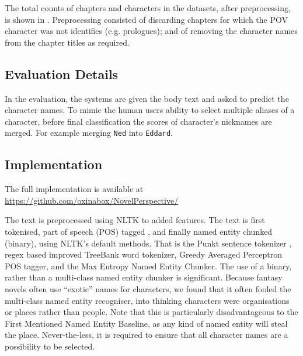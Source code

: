 \documentclass[11pt,a4paper]{article}
\newcommand{\parencite}{\citep}
\begin{document}
The total counts of chapters and characters in the datasets, after preprocessing, is shown in .
Preprocessing consisted of  discarding chapters for which the POV character was not identifies (e.g. prologues); and of removing the character names from the chapter titles as required.

\subsection{Evaluation Details}
In the evaluation, the systems are given the body text and asked to predict the character names.
To mimic the human users ability to select multiple aliases of a character, before final classification the scores of character's nicknames are merged.
For example merging \texttt{Ned} into \texttt{Eddard}.

%

\subsection{Implementation}
The full implementation is available at \url{https://github.com/oxinabox/NovelPerspective/}

The text is preprocessed using NLTK \parencite{NLTK} to added features.
The text is first tokenised, part of speech (POS) tagged , and finally named entity chunked (binary), using NLTK's default methods.
That is the Punkt sentence tokenizer \parencite{kiss2006unsupervised}, regex based improved TreeBank word tokenizer, Greedy Averaged Perceptron POS tagger, and the Max Entropy Named Entity Chunker.
The use of a binary, rather than a multi-class named entity chunker is significant.
Because fantasy novels often use ``exotic'' names for characters, we found that it often  fooled the multi-class named entity recogniser, into thinking characters were organisations or places rather than people.
Note that this is particularly disadvantageous to the First Mentioned Named Entity Baseline, as any kind of named entity will steal the place.
Never-the-less, it is required to ensure that all character names are a possibility to be selected.
\end{document}
